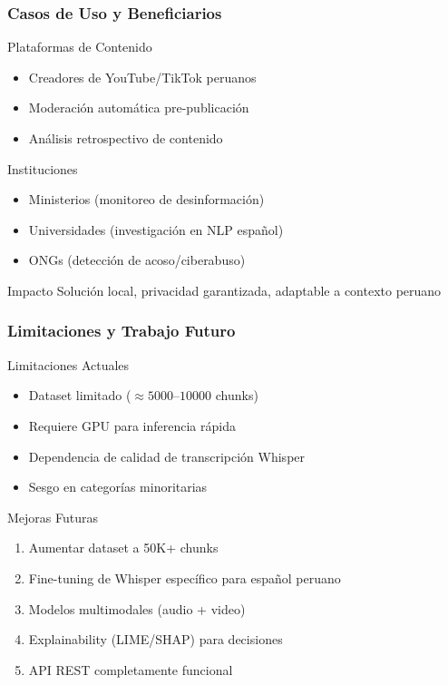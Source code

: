 \documentclass[aspectratio=169,10pt]{beamer}
\begin{document}
\begin{frame}
  \frametitle{Casos de Uso y Beneficiarios}
  
  \begin{block}{Plataformas de Contenido}
    \begin{itemize}
      \item Creadores de YouTube/TikTok peruanos
      \item Moderación automática pre-publicación
      \item Análisis retrospectivo de contenido
    \end{itemize}
  \end{block}

  \begin{block}{Instituciones}
    \begin{itemize}
      \item Ministerios (monitoreo de desinformación)
      \item Universidades (investigación en NLP español)
      \item ONGs (detección de acoso/ciberabuso)
    \end{itemize}
  \end{block}

  \begin{block}{Impacto}
    Solución local, privacidad garantizada, adaptable a contexto peruano
  \end{block}
\end{frame}

\begin{frame}
  \frametitle{Limitaciones y Trabajo Futuro}
  
  \begin{block}{Limitaciones Actuales}
    \begin{itemize}
      \item Dataset limitado ($\approx 5000$--$10000$ chunks)
      \item Requiere GPU para inferencia rápida
      \item Dependencia de calidad de transcripción Whisper
      \item Sesgo en categorías minoritarias
    \end{itemize}
  \end{block}

  \begin{block}{Mejoras Futuras}
    \begin{enumerate}
      \item Aumentar dataset a 50K+ chunks
      \item Fine-tuning de Whisper específico para español peruano
      \item Modelos multimodales (audio + video)
      \item Explainability (LIME/SHAP) para decisiones
      \item API REST completamente funcional
    \end{enumerate}
  \end{block}
\end{frame}
\end{document}
